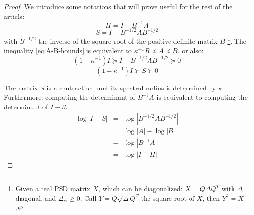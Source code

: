 \begin{proof} We introduce some notations that will prove useful
for the rest of the article: 
\[
H=I-B^{-1}A
\]
\[
S=I-B^{-1/2}AB^{-1/2}
\]
with $B^{-1/2}$ the inverse of the square root of the positive-definite
matrix $B$%
\footnote{Given a real PSD matrix $X$, which can be diagonalized: $X=Q\Delta Q^{T}$
with $\Delta$ diagonal, and $\Delta_{ii}\geq0$. Call $Y=Q\sqrt{\Delta}Q^{T}$
the square root of $X$, then $Y^{2}=X$.%
}. The inequality \ref{eq:A-B-bounds} is equivalent to $\kappa^{-1}B\preceq A\preceq B$,
or also: 
\[
\left(1-\kappa^{-1}\right)I\succeq I-B^{-1/2}AB^{-1/2}\succeq0
\]
\begin{equation}
\left(1-\kappa^{-1}\right)I\succeq S\succeq0\label{eq:s-encadrement}
\end{equation}


The matrix $S$ is a contraction, and its spectral radius is determined
by $\kappa$. Furthermore, computing the determinant of $B^{-1}A$
is equivalent to computing the determinant of $I-S$: 
\begin{eqnarray*}
\log\left|I-S\right| & = & \log\left|B^{-1/2}AB^{-1/2}\right|\\
 & = & \log\left|A\right|-\log\left|B\right|\\
 & = & \log\left|B^{-1}A\right|\\
 & = & \log\left|I-H\right|
\end{eqnarray*}



\end{proof}
